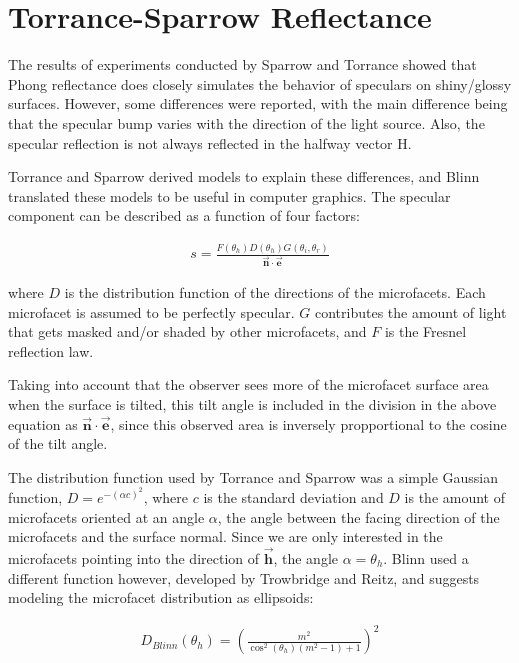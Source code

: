 \section{Torrance-Sparrow Reflectance}\label{sec:CookTorrance}
	The results of experiments conducted by Sparrow and Torrance  showed that Phong reflectance does closely simulates the behavior of speculars on shiny/glossy surfaces. However, some differences were reported, with the main difference being that the specular bump varies with the direction of the light source. Also, the specular reflection is not always reflected in the halfway vector H. 

Torrance and Sparrow derived models to explain these differences, and Blinn translated these models to be useful in computer graphics. The specular component can be described as a function of four factors: 
	
	\begin{eqnarray*}
		s = \frac{F(\theta_h)D(\theta_h)G(\theta_i,\theta_r)}{\vec{\mathbf{n}} \cdot \vec{\mathbf{e}}}
	\end{eqnarray*}

where $D$ is the distribution function of the directions of the microfacets. Each microfacet is assumed to be perfectly specular. $G$ contributes the amount of light that gets masked and/or shaded by other microfacets, and $F$ is the Fresnel reflection law.

Taking into account that the observer sees more of the microfacet surface area when the surface is tilted, this tilt angle is included in the division in the above equation as $\vec{\mathbf{n}} \cdot \vec{\mathbf{e}}$, since this observed area is inversely propportional to the cosine of the tilt angle.

The distribution function used by Torrance and Sparrow was a simple Gaussian function, $D = e^{-(\alpha c)^2}$, where $c$ is the standard deviation and $D$ is the amount of microfacets oriented at an angle $\alpha$, the angle between the facing direction of the microfacets and the surface normal. Since we are only interested in the microfacets pointing into the direction of $\vec{\mathbf{h}}$, the angle $\alpha = \theta_h$. Blinn used a different function however, developed by Trowbridge and Reitz, and suggests modeling the microfacet distribution as ellipsoids:

	\begin{eqnarray*}
		D_{Blinn}(\theta_h) = \left({ \frac{m^2}{\cos^2(\theta_h)(m^2-1)+1} } \right)^2
	\end{eqnarray*}

